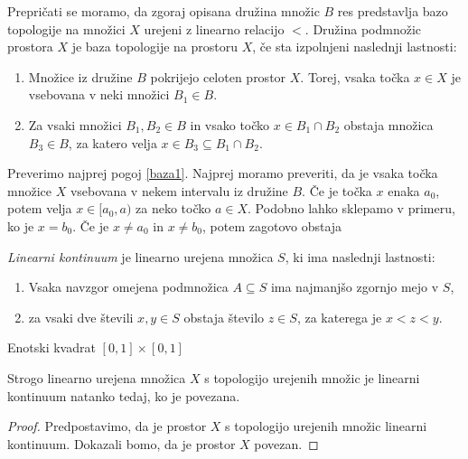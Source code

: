 \documentclass[../TG_magistrsko_delo_sections.tex]{subfiles}
\begin{document}
Prepričati se moramo, da zgoraj opisana družina množic $B$ res predstavlja bazo topologije na množici $X$ urejeni z linearno relacijo $<$. Družina podmnožic prostora $X$ je baza topologije na prostoru $X$, če sta izpolnjeni naslednji lastnosti:
\begin{enumerate}[label={(b\arabic*)}]
\item Množice iz družine $B$ pokrijejo celoten prostor $X$. Torej, vsaka točka $x \in X$ je vsebovana v neki množici $B_1 \in B$. \label{baza1}
\item Za vsaki množici $B_1, B_2 \in B$ in vsako točko $x\in B_1 \cap B_2$ obstaja množica $B_3 \in B$, za katero velja $x \in B_3 \subseteq B_1 \cap B_2$.\label{baza2}
\end{enumerate}
Preverimo najprej pogoj \ref{baza1}.
 Najprej moramo preveriti, da je vsaka točka množice $X$ vsebovana v nekem intervalu iz družine $B$. Če je točka $x$ enaka $a_0$, potem velja $x \in [a_0, a)$ za neko točko $a \in X$. Podobno lahko sklepamo v primeru, ko je $x = b_0$. Če je $x \neq a_0$ in $x \neq b_0$, potem zagotovo obstaja

\begin{definicija}
\emph{Linearni kontinuum} je linearno urejena množica $S$, ki ima naslednji lastnosti:
\begin{enumerate}
\item Vsaka navzgor omejena podmnožica $A \subseteq S$ ima najmanjšo zgornjo mejo v $S$,
\item za vsaki dve števili $x, y \in S$ obstaja število $z \in S$, za katerega je $x<z<y$.
\end{enumerate}
\end{definicija}

\begin{primer}
Enotski kvadrat $[0, 1] \times [0, 1]$ 
\end{primer}

\begin{trditev}
Strogo linearno urejena množica $X$ s topologijo urejenih množic je linearni kontinuum natanko tedaj, ko je povezana.
\end{trditev}
\begin{proof}
Predpostavimo, da je prostor $X$ s topologijo urejenih množic linearni kontinuum. Dokazali bomo, da je prostor $X$ povezan.  
\end{proof}
\end{document}
